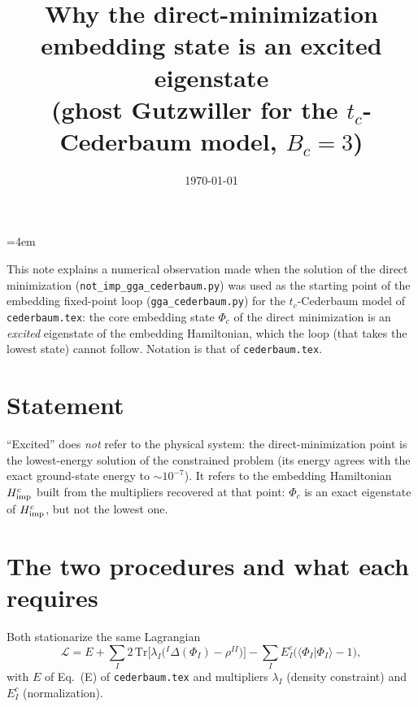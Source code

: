 \documentclass[11pt]{article}
\title{Why the direct-minimization embedding state is an excited eigenstate\\
\large (ghost Gutzwiller for the $t_c$-Cederbaum model, $B_c=3$)}
\author{}
\date{\today}
\newcommand{\braket}[1]{\langle #1\rangle}
\newcommand{\Tr}{\mathrm{Tr}}
\begin{document}
\emergencystretch=4em
\maketitle

\noindent This note explains a numerical observation made when the solution of the direct minimization
(\texttt{not\_imp\_gga\_cederbaum.py}) was used as the starting point of the embedding fixed-point loop
(\texttt{gga\_cederbaum.py}) for the $t_c$-Cederbaum model of \texttt{cederbaum.tex}: the core embedding state $\Phi_c$ of the direct
minimization is an \emph{excited} eigenstate of the embedding Hamiltonian, which the loop (that takes the lowest state) cannot follow.
Notation is that of \texttt{cederbaum.tex}.

\section{Statement}

``Excited'' does \emph{not} refer to the physical system: the direct-minimization point is the lowest-energy solution of the
constrained problem (its energy agrees with the exact ground-state energy to $\sim10^{-7}$). It refers to the embedding Hamiltonian
$H^c_{\rm imp}$ built from the multipliers recovered at that point: $\Phi_c$ is an exact eigenstate of $H^c_{\rm imp}$, but not the lowest one.

\section{The two procedures and what each requires}

Both stationarize the same Lagrangian
\begin{equation}
\mathcal L=E+\sum_I2\,\Tr\big[\lambda_I\big({}^I\Delta(\Phi_I)-\rho^{II}\big)\big]-\sum_IE^c_I\big(\braket{\Phi_I|\Phi_I}-1\big),
\end{equation}
with $E$ of Eq.~(E) of \texttt{cederbaum.tex} and multipliers $\lambda_I$ (density constraint) and $E^c_I$ (normalization).
\end{document}
